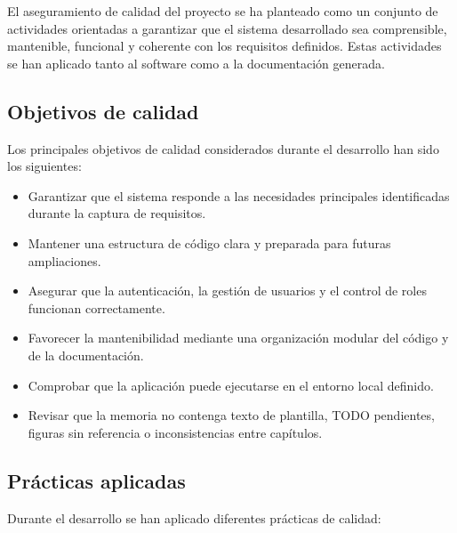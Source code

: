 El aseguramiento de calidad del proyecto se ha planteado como un conjunto de actividades orientadas a garantizar que el sistema desarrollado sea comprensible, mantenible, funcional y coherente con los requisitos definidos. Estas actividades se han aplicado tanto al software como a la documentación generada.

\subsection{Objetivos de calidad}

Los principales objetivos de calidad considerados durante el desarrollo han sido los siguientes:

\begin{itemize}
    \item Garantizar que el sistema responde a las necesidades principales identificadas durante la captura de requisitos.
    \item Mantener una estructura de código clara y preparada para futuras ampliaciones.
    \item Asegurar que la autenticación, la gestión de usuarios y el control de roles funcionan correctamente.
    \item Favorecer la mantenibilidad mediante una organización modular del código y de la documentación.
    \item Comprobar que la aplicación puede ejecutarse en el entorno local definido.
    \item Revisar que la memoria no contenga texto de plantilla, TODO pendientes, figuras sin referencia o inconsistencias entre capítulos.
\end{itemize}

\subsection{Prácticas aplicadas}

Durante el desarrollo se han aplicado diferentes prácticas de calidad:

